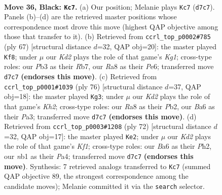 \documentclass[11pt]{article}
\begin{document}
\clearpage

\begin{figure}[p]\centering
\begin{subfigure}{0.46\textwidth}\centering
\resizebox{\linewidth}{!}{%
\newchessgame
\chessboard[
  setfen={r7/3k1N2/b1p1p3/P3P2p/R4P1P/1p6/1b5K/1N6 b - - 7 36},
  showmover=false,
  pgfstyle=straightmove, color=movearrow, markmove={d7-c7}
]}
\caption{}
\end{subfigure}\hfill
\begin{subfigure}{0.46\textwidth}\centering
\resizebox{\linewidth}{!}{%
\newchessgame
\chessboard[
  setfen={6k1/1rb2p2/4pp2/P1p4p/2N5/1P3P2/5P1P/R5K1 b - - 0 34},
  showmover=false,
  pgfstyle=straightmove, color=movearrow, markmove={g8-f8}
]}
\caption{}
\end{subfigure}
\\[4pt]
\begin{subfigure}{0.46\textwidth}\centering
\resizebox{\linewidth}{!}{%
\newchessgame
\chessboard[
  setfen={6k1/1R6/4pnp1/p2p4/7P/P4B1P/1P3P1K/2r5 w - - 2 39},
  showmover=false,
  pgfstyle=straightmove, color=movearrow, markmove={h2-g3}
]}
\caption{}
\end{subfigure}\hfill
\begin{subfigure}{0.46\textwidth}\centering
\resizebox{\linewidth}{!}{%
\newchessgame
\chessboard[
  setfen={r7/3kp2p/6p1/p2Pp3/P3n3/1P6/6PP/2R1BK2 w - - 6 37},
  showmover=false,
  pgfstyle=straightmove, color=movearrow, markmove={f1-e2}
]}
\caption{}
\end{subfigure}
\caption{\textbf{Move 36, Black: \texttt{Kc7}.} (a) Our position; Melanie plays \texttt{Kc7} (\texttt{d7c7}). Panels (b)--(d) are the retrieved master positions whose correspondence most drove this move (highest QAP objective among those that transfer to it). (b) Retrieved from \texttt{ccrl\_top\_p0002\#785} (ply 67) [structural distance $d$=32, QAP obj=20]: the master played \texttt{Kf8}; under $\mu$ our \emph{Kd2} plays the role of that game's \emph{Kg1}; cross-type roles: our \emph{P}b3 as their \emph{R}b7, our \emph{R}a8 as their \emph{P}e6; transferred move \texttt{d7c7} \textbf{(endorses this move)}. (c) Retrieved from \texttt{ccrl\_top\_p0001\#1039} (ply 76) [structural distance $d$=37, QAP obj=18]: the master played \texttt{Kg3}; under $\mu$ our \emph{Kd2} plays the role of that game's \emph{Kh2}; cross-type roles: our \emph{R}a8 as their \emph{P}b2, our \emph{B}a6 as their \emph{P}a3; transferred move \texttt{d7c7} \textbf{(endorses this move)}. (d) Retrieved from \texttt{ccrl\_top\_p0003\#1208} (ply 72) [structural distance $d$=32, QAP obj=17]: the master played \texttt{Ke2}; under $\mu$ our \emph{Kd2} plays the role of that game's \emph{Kf1}; cross-type roles: our \emph{B}a6 as their \emph{P}h2, our \emph{n}b1 as their \emph{P}a4; transferred move \texttt{d7c7} \textbf{(endorses this move)}. Synthesis: 7 retrieved analogs transferred to \texttt{Kc7} (summed QAP objective 89, the strongest correspondence among the candidate moves); Melanie committed it via the \texttt{search} selector.}
\label{fig:thought-m71}
\end{figure}
\end{document}
